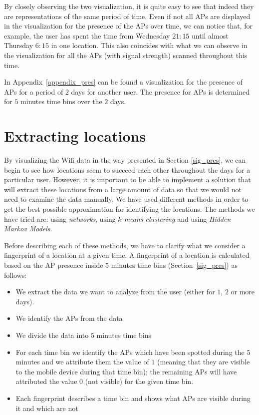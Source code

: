 By closely observing the two visualization, it is quite easy to see that indeed
they are representations of the same period of time. Even if not all APs are
displayed in the visualization for the presence of the APs over time, we can
notice that, for example, the user has spent the time from Wednesday $21:15$
until almost Thursday $6:15$ in one location. This also coincides with what we
can observe in the visualization for all the APs (with signal strength) scanned
throughout this time.

In Appendix~\ref{appendix_pres} can be found a visualization for the presence of
APs for a period of $2$ days for another user. The presence for APs is
determined for $5$ minutes time bins over the $2$ days.

\section{Extracting locations}
\label{extracting_location}

By visualizing the Wifi data in the way presented in Section \ref{sig_pres}, we
can begin to see how locations seem to succeed each other throughout the days
for a particular user. However, it is important to be able to implement a solution
that will extract these locations from a large amount of data so that we would
not need to examine the data manually. We have used different methods in
order to get the best possible approximation for identifying the locations. The
methods we have tried are: using \textit{networks}, using \textit{$k$-means
clustering} and using \textit{Hidden Markov Models}.

Before describing each of these methods, we have to clarify what we consider a
fingerprint of a location at a given time. A fingerprint of a location is
calculated based on the AP presence inside $5$ minutes time bins
(Section~\ref{sig_pres}) as follows:
\begin{itemize}
  \item We extract the data we want to analyze from the user (either for $1$,
  $2$ or more days).
  \item We identify the APs from the data
  \item We divide the data into $5$ minutes time bins
  \item For each time bin we identify the APs which have been spotted during the
  $5$ minutes and we attribute them the value of $1$ (meaning that they are
  visible to the mobile device during that time bin); the remaining APs will
  have attributed the value $0$ (not visible) for the given time bin.
  \item Each fingerprint describes a time bin and shows what APs are visible
  during it and which are not
\end{itemize}

